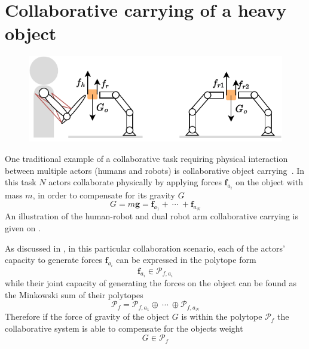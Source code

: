 \section{Collaborative carrying of a heavy object}
\label{ch:collaborative_carrying}

\begin{figure}[!h]
    \centering
    \includegraphics[width=0.8\linewidth]{Papers/images/carrying_schema.pdf}
    \caption{}
    \label{fig:carrying_schema}
\end{figure}

One traditional example of a collaborative task requiring physical interaction between multiple actors (humans and robots) is collaborative object carrying~\cite{Arai2000carrying,Kosuge1997carrying,Tsumugiwa2002carrying}. In this task $N$ actors collaborate physically by applying forces $\bm{f}_{a_i}$ on the object with mass $m$, in order to compensate for its gravity $G$
\begin{equation}
    G=m\bm{g}=\bm{f}_{a_1} + ~\cdots ~+\bm{f}_{a_N}
\end{equation}
An illustration of the human-robot and dual robot arm collaborative carrying is given on . 

As discussed in , in this particular collaboration scenario, each of the actors' capacity to generate forces $\bm{f}_{a_i}$ can be expressed in the polytope form
\begin{equation}
    \bm{f}_{a_i} \in \mathcal{P}_{f,a_i}
\end{equation}
while their joint capacity of generating the forces on the object can be found as the Minkowski sum of their polytopes
\begin{equation}
    \mathcal{P}_f = \mathcal{P}_{f,a_1} \oplus~\cdots~\oplus \mathcal{P}_{f,a_N}
\end{equation}
Therefore if the force of gravity of the object $G$ is within the polytope $\mathcal{P}_f$ the collaborative system is able to compensate for the objects weight
\begin{equation}
    G \in \mathcal{P}_f
\end{equation}

